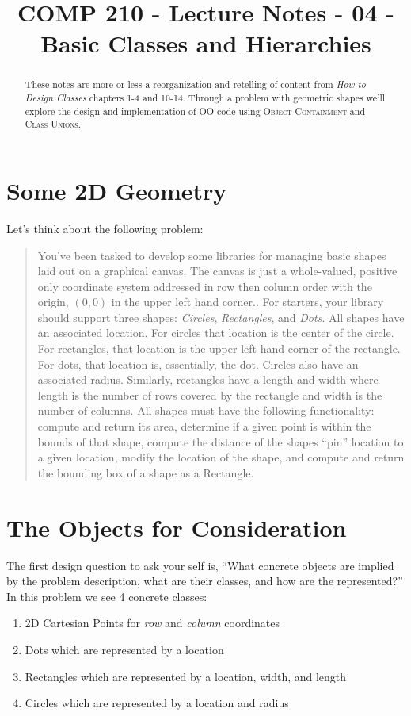 \documentclass[]{tufte-handout}
\title{COMP 210 - Lecture Notes - 04 - Basic Classes and Hierarchies}
\begin{document}
\maketitle

\begin{abstract}
These notes are more or less a reorganization and retelling of content from \textit{How to Design Classes} chapters 1-4 and 10-14. Through a problem with geometric shapes we'll explore the design and implementation of OO code using \textsc{Object Containment} and \textsc{Class Unions}.   
\end{abstract}

\section{Some 2D Geometry}

Let's think about the following problem:
\begin{quote}
You've been tasked to develop some libraries for managing basic shapes laid out on a graphical canvas. The canvas is just a whole-valued, positive only coordinate system addressed in row then column order with the origin, $(0,0)$ in the upper left hand corner.. For starters, your library should support three shapes: \textit{Circles}, \textit{Rectangles}, and \textit{Dots}. All shapes have an associated location. For circles that location is the center of the circle. For rectangles, that location is the upper left hand corner of the rectangle. For dots, that location is, essentially, the dot. Circles also have an associated radius. Similarly, rectangles have a length and width where length is the number of rows covered by the rectangle and width is the number of columns.  
All shapes must have the following functionality: compute and return its area, determine if a given point is within the bounds of that shape, compute the distance of the shapes ``pin'' location to a given location, modify the location of the shape, and compute and return the bounding box of a shape as a Rectangle.
\end{quote}

\section{The Objects for Consideration}

The first design question to ask your self is, ``What concrete objects are implied by the problem description, what are their classes, and how are the represented?'' In this problem we see 4 concrete classes:
\begin{enumerate}
\item 2D Cartesian Points for \textit{row} and \textit{column} coordinates
\item Dots which are represented by a location
\item Rectangles which are represented by a location, width, and length
\item Circles which are represented by a location and radius
\end{enumerate}
\end{document}
